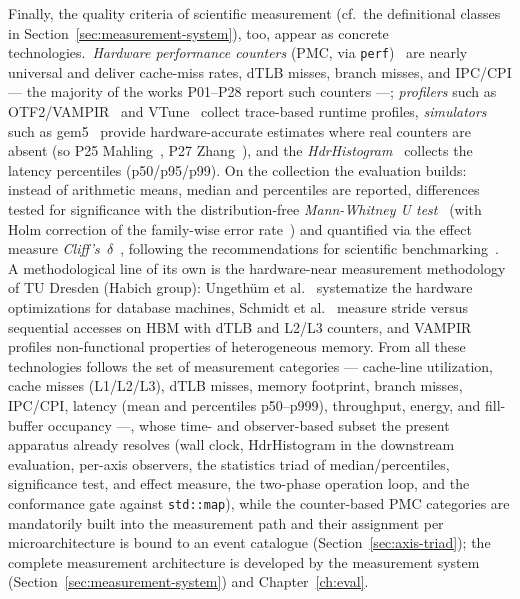 \begin{nurlang}
Finally, the quality criteria of scientific measurement (cf.\ the definitional classes in Section~\ref{sec:measurement-system}), too, appear
as concrete technologies.\ \emph{Hardware performance counters} (PMC, via \texttt{perf})~\cite{demelo2010perf}
are nearly universal and deliver cache-miss rates, dTLB misses, branch misses, and IPC/CPI --- the
majority of the works P01--P28 report such counters ---; \emph{profilers}
such as OTF2/VAMPIR~\cite{berthold2023vampir} and VTune~\cite{reinders2005vtune} collect trace-based
runtime profiles, \emph{simulators} such as gem5~\cite{binkert2011gem5} provide hardware-accurate estimates where
real counters are absent (so P25 Mahling~\cite{mahling2025hotpath}, P27
Zhang~\cite{zhang2025hierarchical}), and the \emph{HdrHistogram}~\cite{tene_hdrhistogram} collects the latency
percentiles (p50/p95/p99). On the collection the evaluation builds: instead of arithmetic means, median and
percentiles are reported, differences tested for significance with the distribution-free \emph{Mann-Whitney U test}~\cite{mann1947utest}
(with Holm correction of the family-wise error rate~\cite{holm1979sequential}) and quantified via the effect measure
\emph{Cliff's~$\delta$}~\cite{cliff1993dominance}, following the recommendations for scientific
benchmarking~\cite{hoefler2015benchmarking}. A methodological line of its own is the hardware-near
measurement methodology of TU Dresden (Habich group): Ungethüm et al.~\cite{ungethuem2017survey} systematize the
hardware optimizations for database machines, Schmidt et al.~\cite{schmidt2025hbm} measure stride versus
sequential accesses on HBM with dTLB and L2/L3 counters, and VAMPIR~\cite{berthold2023vampir} profiles non-functional properties
of heterogeneous memory. From all these technologies follows the set of measurement categories ---
cache-line utilization, cache misses (L1/L2/L3), dTLB misses, memory footprint, branch misses,
IPC/CPI, latency (mean and percentiles p50--p999), throughput, energy, and fill-buffer occupancy ---,
whose time- and observer-based subset the present apparatus already resolves (wall clock,
HdrHistogram in the downstream evaluation, per-axis observers, the statistics triad of
median/percentiles, significance test, and effect measure, the two-phase operation loop, and the
conformance gate against \texttt{std::map}),
while the counter-based PMC categories are mandatorily built into the measurement path and their assignment per
microarchitecture is bound to an event catalogue (Section~\ref{sec:axis-triad}); the
complete measurement architecture is developed by the measurement system (Section~\ref{sec:measurement-system})
and Chapter~\ref{ch:eval}.
\end{nurlang}
